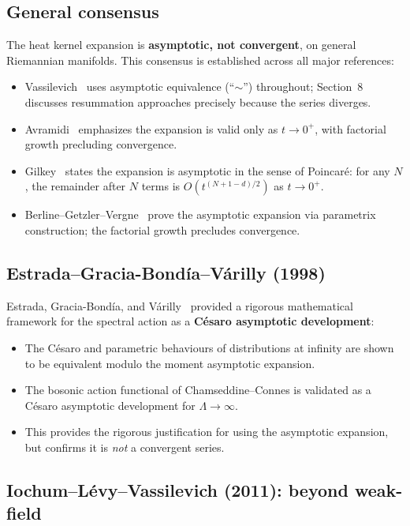\documentclass[11pt,a4paper]{article}
\newcommand{\Lam}{\Lambda}
\begin{document}
\subsection{General consensus}

The heat kernel expansion is \textbf{asymptotic, not convergent}, on
general Riemannian manifolds.  This consensus is established across all
major references:

\begin{itemize}
  \item Vassilevich~\cite{V03} uses asymptotic equivalence (``$\sim$'')
    throughout; Section~8 discusses resummation approaches precisely
    because the series diverges.
  \item Avramidi~\cite{A00} emphasizes the expansion is valid only as
    $t \to 0^+$, with factorial growth precluding convergence.
  \item Gilkey~\cite{G95} states the expansion is asymptotic in the
    sense of Poincar\'{e}: for any $N$, the remainder after $N$ terms
    is $O(t^{(N+1-d)/2})$ as $t \to 0^+$.
  \item Berline--Getzler--Vergne~\cite{BGV04} prove the asymptotic
    expansion via parametrix construction; the factorial growth precludes
    convergence.
\end{itemize}

\subsection{Estrada--Gracia-Bond\'{i}a--V\'{a}rilly (1998)}

Estrada, Gracia-Bond\'{i}a, and V\'{a}rilly~\cite{EGV98} provided a
rigorous mathematical framework for the spectral action as a
\textbf{C\'{e}saro asymptotic development}:

\begin{itemize}
  \item The C\'{e}saro and parametric behaviours of distributions at
    infinity are shown to be equivalent modulo the moment asymptotic
    expansion.
  \item The bosonic action functional of Chamseddine--Connes is validated
    as a C\'{e}saro asymptotic development for $\Lam \to \infty$.
  \item This provides the rigorous justification for using the asymptotic
    expansion, but confirms it is \emph{not} a convergent series.
\end{itemize}

\subsection{Iochum--L\'{e}vy--Vassilevich (2011): beyond weak-field}
\end{document}
